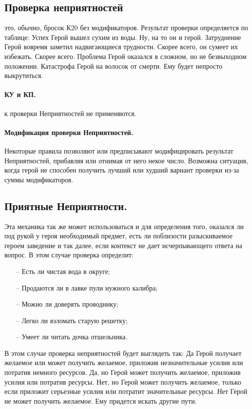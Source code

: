 \subsection{Проверка неприятностей} это, обычно, бросок К20 без модификаторов. Результат проверки определяется по таблице:
\trouble
{Успех}%
{Герой вышел сухим из воды. Ну, на то он и герой.}%
{Затруднение}%
{Герой вовремя заметил надвигающиеся трудности. Скорее всего, он сумеет их избежать. Скорее всего.}%
{Проблема}%
{Герой оказался в сложном, но не безвыходном положении.}%
{Катастрофа}%
{Герой на волосок от смерти. Ему будет непросто выкрутиться.}%

\paragraph{КУ и КП.} к проверки Неприятностей не применяются.

\paragraph{Модификация проверки Неприятностей.} Некоторые правила позволяют или предписывают модифицировать результат Неприятностей, прибавляя или отнимая от него некое число. Возможна ситуация, когда герой не способен получить лучший или худший вариант проверки из-за суммы модификаторов.

\subsection{Приятные Неприятности.} Эта механика так же может использоваться и для определения того, оказался ли под рукой у героя необходимый предмет, есть ли поблизости разыскиваемое героем заведение и так далее, если контекст не дает исчерпывающего ответа на вопрос. В этом случае проверка определит:
\begin{itemize}
    \item[--] Есть ли чистая вода в округе;
    \item[--] Продаются ли в лавке пули нужного калибра;
    \item[--] Можно ли доверять проводнику;
    \item[--] Легко ли взломать старую решетку;
    \item[--] Умеет ли читать дочка отшельника.
\end{itemize}
В этом случае проверка неприятностей будет выглядеть так: 
\trouble
{Да}%
{Герой получает желаемое или может получить желаемое, приложив незначительные усилия или потратив немного ресурсов.}%
{Да, но}%
{Герой может получить желаемое, приложив усилия или потратив ресурсы.}%
{Нет, но}%
{Герой может получить желаемое, только если приложит серьезные усилия или потратит значительные ресурсы.}%
{Нет}%
{Герой не может получить желаемое. Ему придется искать другие пути.}%

